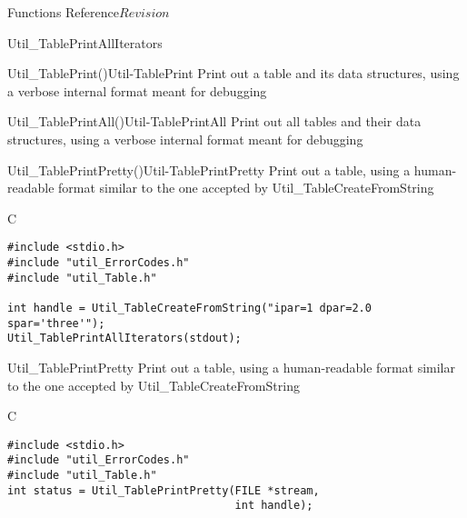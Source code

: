 \begin{cactuspart}{ Functions Reference}{}{$Revision$}
\begin{FunctionDescription}{Util\_TablePrintAllIterators}
\begin{SeeAlsoSection}
\begin{SeeAlso2}{Util\_TablePrint()}{Util-TablePrint}
Print out a table and its data structures, using a verbose internal
format meant for debugging
\end{SeeAlso2}
\begin{SeeAlso2}{Util\_TablePrintAll()}{Util-TablePrintAll}
Print out all tables and their data structures, using a verbose
internal format meant for debugging
\end{SeeAlso2}
\begin{SeeAlso2}{Util\_TablePrintPretty()}{Util-TablePrintPretty}
Print out a table, using a human-readable format similar to the one
accepted by Util\_TableCreateFromString
\end{SeeAlso2}
\end{SeeAlsoSection}


\begin{ExampleSection}
\begin{Example}{C}
\begin{verbatim}
#include <stdio.h>
#include "util_ErrorCodes.h"
#include "util_Table.h"

int handle = Util_TableCreateFromString("ipar=1 dpar=2.0 spar='three'");
Util_TablePrintAllIterators(stdout);
\end{verbatim}
\end{Example}
\end{ExampleSection}
\end{FunctionDescription}


\begin{FunctionDescription}{Util\_TablePrintPretty}
\label{Util-TablePrintPretty}
Print out a table, using a human-readable format similar to the one
accepted by Util\_TableCreateFromString

\begin{SynopsisSection}
\begin{Synopsis}{C}
\begin{verbatim}
#include <stdio.h>
#include "util_ErrorCodes.h"
#include "util_Table.h"
int status = Util_TablePrintPretty(FILE *stream,
                                   int handle);
\end{verbatim}
\end{Synopsis}
\end{SynopsisSection}


\end{FunctionDescription}
\end{cactuspart}

